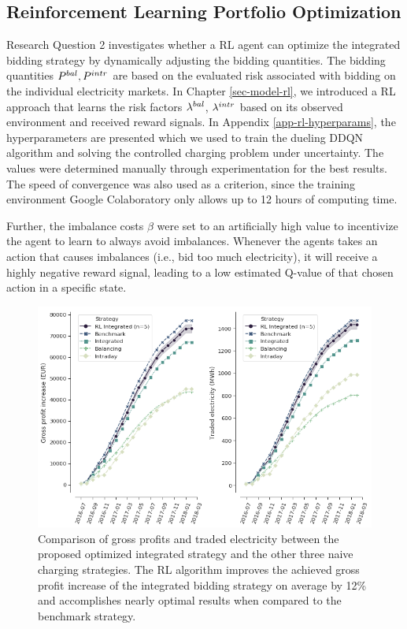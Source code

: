 \documentclass[a4paper, 12pt]{article}
\begin{document}
\subsection{Reinforcement Learning Portfolio Optimization}
\label{sec:orgbec57b9}
Research Question 2 investigates whether a RL agent can optimize the integrated
bidding strategy by dynamically adjusting the bidding quantities. The bidding
quantities \(P^{bal}_{}, P^{intr}_{}\) are based on the evaluated risk associated with
bidding on the individual electricity markets. In Chapter \ref{sec-model-rl}, we
introduced a RL approach that learns the risk factors \(\lambda^{bal}_{}\), \(\lambda^{intr}_{}\) based on
its observed environment and received reward signals. In Appendix
\ref{app-rl-hyperparams}, the hyperparameters are presented which we used to train
the dueling DDQN algorithm and solving the controlled charging problem under
uncertainty. The values were determined manually through experimentation for the
best results. The speed of convergence was also used as a criterion, since the
training environment Google Colaboratory only allows up to 12 hours of computing
time.

Further, the imbalance costs \(\beta\) were set to an artificially high value to
incentivize the agent to learn to always avoid imbalances. Whenever the agents
takes an action that causes imbalances (i.e., bid too much electricity), it will
receive a highly negative reward signal, leading to a low estimated Q-value of
that chosen action in a specific state.

\begin{figure}[h]
\centering
\includegraphics[width=1\linewidth]{fig/rl-results.png}
\caption[Comparison of gross profit results]{Comparison of gross profits and traded electricity between the proposed optimized integrated strategy and the other three naive charging strategies. The RL algorithm improves the achieved gross profit increase of the integrated bidding strategy on average by 12\% and accomplishes nearly optimal results when compared to the benchmark strategy. \label{fig-rl-profits}}
\end{figure}
\end{document}
